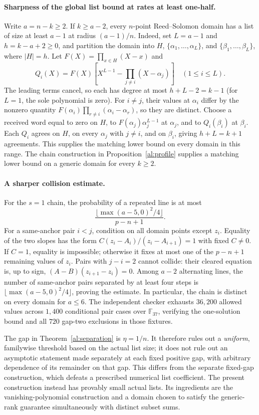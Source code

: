 \documentclass[11pt,letterpaper]{article}
\theoremstyle{definition}
\theoremstyle{remark}
\newcommand{\F}{\mathbb F}
\begin{document}
\paragraph{Sharpness of the global list bound at rates at least one-half.}
Write $a=n-k\ge2$. If $k\ge a-2$, every $n$-point Reed--Solomon domain
has a list of size at least $a-1$ at radius $(a-1)/n$.
Indeed, set $L=a-1$ and $h=k-a+2\ge0$, and partition the domain into
$H$, $\{\alpha_1,\ldots,\alpha_L\}$, and
$\{\beta_1,\ldots,\beta_L\}$, where $|H|=h$.
Let $F(X)=\prod_{x\in H}(X-x)$ and
\[
 Q_i(X)=F(X)\left[X^{L-1}-\prod_{j\ne i}(X-\alpha_j)\right]
 \quad(1\le i\le L).
\]
The leading terms cancel, so each has degree at most
$h+L-2=k-1$ (for $L=1$, the sole polynomial is zero).
For $i\ne j$, their values at $\alpha_i$ differ by the nonzero quantity
$F(\alpha_i)\prod_{r\ne i}(\alpha_i-\alpha_r)$, so they are distinct.
Choose a received word equal to zero on $H$, to
$F(\alpha_j)\alpha_j^{L-1}$ at $\alpha_j$, and to $Q_i(\beta_i)$
at $\beta_i$. Each $Q_i$ agrees on $H$, on every $\alpha_j$ with
$j\ne i$, and on $\beta_i$, giving $h+L=k+1$ agreements.
This supplies the matching lower bound on every domain in this range.
The chain construction in Proposition~\ref{al:profile} supplies a matching
lower bound on a generic domain for every $k\ge2$.

\paragraph{A sharper collision estimate.}
For the $s=1$ chain, the probability of a repeated line is at most
\[
 \frac{\lfloor\max(a-5,0)^2/4\rfloor}{p-n+1}.
\]
For a same-anchor pair $i<j$, condition on all domain points except
$z_i$. Equality of the two slopes has the form
$C(z_i-A_i)/(z_i-A_{i+1})=1$ with fixed $C\ne0$.
If $C=1$, equality is impossible; otherwise it fixes at most one
of the $p-n+1$ remaining values of $z_i$. Pairs with $j-i=2$
cannot collide: their cleared equation is, up to sign,
$(A-B)(z_{i+1}-z_i)=0$. Among $a-2$ alternating lines, the number
of same-anchor pairs separated by at least four steps is
$\lfloor\max(a-5,0)^2/4\rfloor$, proving the estimate.
In particular, the chain is distinct on every domain for $a\le6$.
The independent checker 
exhausts $36{,}200$ allowed values across $1{,}400$ conditional
pair cases over $\F_{37}$, verifying the one-solution bound and
all $720$ gap-two exclusions in those fixtures.

The gap in Theorem~\ref{al:separation} is $\eta=1/n$. It therefore rules out a
\emph{uniform}, familywise threshold based on the actual list size;
it does not rule out an asymptotic statement made separately at each
fixed positive gap, with arbitrary dependence of its remainder on that
gap. This differs from the separate fixed-gap construction, which defeats
a prescribed numerical list coefficient. The present construction
instead has provably small actual lists. Its ingredients are the
vanishing-polynomial construction and a domain chosen to satisfy the
generic-rank guarantee simultaneously with distinct subset sums.
\end{document}
